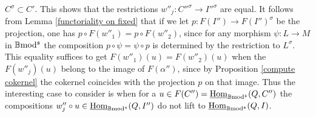 \documentclass[12pt]{article}
\def\Homi{{\underline{\rm Hom}}}
\def\B{{\mathbb B}}
\def\b2{{\rm \B mod^{\mathfrak s}}}
\begin{document}
$C^\sigma\subset C'$. This shows that  the restrictions $w''_j:C''^\sigma\to I''^\sigma$ are equal.\endproof
It follows from Lemma \ref{functoriality on fixed} that if we let $p:F(I'')\to F(I'')^\sigma$ be the projection, one has  $p\circ F(w''_1)=p\circ F(w''_2)$, since for any morphism $\psi:L\to M$ in $\b2$ the composition $p\circ \psi=\psi\circ p$ is determined by the restriction to $L^\sigma$. This equality suffices to get $ F(w''_1)(u)= F(w''_2)(u)$ when the $ F(w''_j)(u)$ belong to the image of $F(\alpha'')$, since by Proposition \ref{compute cokernel} the cokernel coincides with the projection $p$ on that image.
Thus the interesting case to consider is when for a $u\in F(C'')=\Homi_\b2(Q,C'')$ the compositions $w''_j\circ u\in \Homi_\b2(Q,I'')$ do not lift to $\Homi_\b2(Q,I)$. \vspace{.05in}
\end{document}
